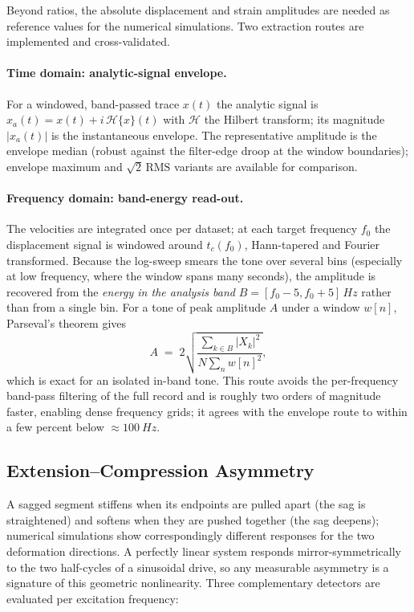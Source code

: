 Beyond ratios, the absolute displacement and strain amplitudes are needed as
reference values for the numerical simulations. Two extraction routes are
implemented and cross-validated.

\paragraph{Time domain: analytic-signal envelope.}
For a windowed, band-passed trace $x(t)$ the analytic signal is
$x_a(t) = x(t) + i\,\mathcal{H}\{x\}(t)$ with $\mathcal{H}$ the Hilbert
transform; its magnitude $|x_a(t)|$ is the instantaneous envelope. The
representative amplitude is the envelope median (robust against the
filter-edge droop at the window boundaries); envelope maximum and
$\sqrt{2}\,\mathrm{RMS}$ variants are available for comparison.

\paragraph{Frequency domain: band-energy read-out.}
The velocities are integrated once per dataset; at each target frequency
$f_0$ the displacement signal is windowed around $t_c(f_0)$, Hann-tapered
and Fourier transformed. Because the log-sweep smears the tone over several
bins (especially at low frequency, where the window spans many seconds), the
amplitude is recovered from the \emph{energy in the analysis band}
$B = [f_0 - 5, f_0 + 5]\,\si{Hz}$ rather than from a single bin. For a tone
of peak amplitude $A$ under a window $w[n]$, Parseval's theorem gives
\begin{equation}
  A \;=\; 2\sqrt{\frac{\sum_{k \in B} |X_k|^2}{N \sum_n w[n]^2}} ,
  \label{eq:bandenergy}
\end{equation}
which is exact for an isolated in-band tone. This route avoids the
per-frequency band-pass filtering of the full record and is roughly two
orders of magnitude faster, enabling dense frequency grids; it agrees with
the envelope route to within a few percent below $\approx\SI{100}{Hz}$.

\subsection{Extension--Compression Asymmetry}
\label{sec:proc:asymmetry}

A sagged segment stiffens when its endpoints are pulled apart (the sag is
straightened) and softens when they are pushed together (the sag deepens);
numerical simulations show correspondingly different responses for the two
deformation directions. A perfectly linear system responds
mirror-symmetrically to the two half-cycles of a sinusoidal drive, so any
measurable asymmetry is a signature of this geometric nonlinearity. Three
complementary detectors are evaluated per excitation frequency:

